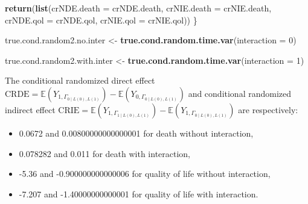 \documentclass[
]{book}
\newenvironment{Shaded}{\begin{snugshade}}{\end{snugshade}}
\newcommand{\AttributeTok}[1]{\textcolor[rgb]{0.13,0.29,0.53}{#1}}
\newcommand{\DecValTok}[1]{\textcolor[rgb]{0.00,0.00,0.81}{#1}}
\newcommand{\FunctionTok}[1]{\textcolor[rgb]{0.13,0.29,0.53}{\textbf{#1}}}
\newcommand{\NormalTok}[1]{#1}
\newcommand{\OtherTok}[1]{\textcolor[rgb]{0.56,0.35,0.01}{#1}}
\providecommand{\tightlist}{%
  \setlength{\itemsep}{0pt}\setlength{\parskip}{0pt}}
\begin{document}
\begin{Shaded}
\begin{Highlighting}[]
  \FunctionTok{return}\NormalTok{(}\FunctionTok{list}\NormalTok{(}\AttributeTok{crNDE.death =}\NormalTok{ crNDE.death, }\AttributeTok{crNIE.death =}\NormalTok{ crNIE.death, }
              \AttributeTok{crNDE.qol =}\NormalTok{ crNDE.qol, }\AttributeTok{crNIE.qol =}\NormalTok{ crNIE.qol))}
\NormalTok{\}}
\end{Highlighting}
\end{Shaded}

\begin{Shaded}
\begin{Highlighting}[]
\NormalTok{true.cond.random2.no.inter }\OtherTok{\textless{}{-}} \FunctionTok{true.cond.random.time.var}\NormalTok{(}\AttributeTok{interaction =} \DecValTok{0}\NormalTok{)}

\NormalTok{true.cond.random2.with.inter }\OtherTok{\textless{}{-}} \FunctionTok{true.cond.random.time.var}\NormalTok{(}\AttributeTok{interaction =} \DecValTok{1}\NormalTok{)}
\end{Highlighting}
\end{Shaded}

The conditional randomized direct effect \(\text{CRDE}=\mathbb{E}\left(Y_{1,\Gamma_{0\mid L(0),L(1)}}\right) - \mathbb{E}\left(Y_{0,\Gamma_{0\mid L(0),L(1)}}\right)\) and conditional randomized indirect effect \(\text{CRIE}=\mathbb{E}\left(Y_{1,\Gamma_{1\mid L(0),L(1)}}\right) - \mathbb{E}\left(Y_{1,\Gamma_{0\mid L(0),L(1)}}\right)\) are respectively:

\begin{itemize}
\tightlist
\item
  0.0672 and 0.00800000000000001 for death without interaction,
\item
  0.078282 and 0.011 for death with interaction,
\item
  -5.36 and -0.900000000000006 for quality of life without interaction,
\item
  -7.207 and -1.40000000000001 for quality of life with interaction.
\end{itemize}
\end{document}
